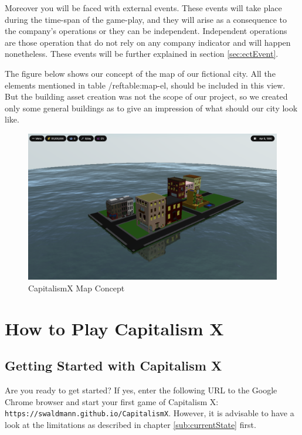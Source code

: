 \documentclass[11pt,titlepage,oneside,openany]{book}
\begin{document}
Moreover you will be faced with external events. These events will take place during the time-span of the game-play, and they will arise as a consequence to the company’s operations or they can be independent. Independent operations are those operation that do not rely on any company indicator and will happen nonetheless. These events will be further explained in section \ref{sec:ectEvent}.	

The figure below shows our concept of the map of our fictional city. All the elements mentioned in table /ref{table:map-el}, should be included in this view. But the building asset creation was not the scope of our project, so we created only some general buildings as to give an impression
of what should our city look like. 
\begin{figure} [!ht]
    \centering
    \includegraphics[scale=0.23]{images/screenshot-map.png}
    \caption{CapitalismX Map Concept}
    \label{fig:map}
\end{figure}



\chapter{How to Play Capitalism X}
\label{cha:howtoplay}

\section{Getting Started with Capitalism X}

Are you ready to get started? If yes, enter the following URL to the Google Chrome browser and start your first game of Capitalism X: \\
\texttt{https://swaldmann.github.io/CapitalismX}.
However, it is advisable to have a look at the limitations as described in chapter \ref{sub:currentState} first.
\end{document}
